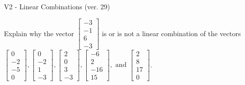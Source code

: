 \begin{exercise}
  \begin{exerciseTitle}V2 - Linear Combinations (ver. 29)\end{exerciseTitle}
  \begin{exerciseStatement}
    Explain why the vector \(\left[\begin{array}{c}
-3 \\
-1 \\
6 \\
-3
\end{array}\right]\)  is or is not a linear 
	combination of the vectors \(\left[\begin{array}{c}
0 \\
-2 \\
-5 \\
0
\end{array}\right] , \left[\begin{array}{c}
0 \\
-2 \\
1 \\
-3
\end{array}\right] , \left[\begin{array}{c}
2 \\
0 \\
3 \\
-3
\end{array}\right] , \left[\begin{array}{c}
-6 \\
2 \\
-16 \\
15
\end{array}\right] , \text{ and } \left[\begin{array}{c}
2 \\
8 \\
17 \\
0
\end{array}\right]\).
	



\end{exerciseStatement}
\end{exercise}
